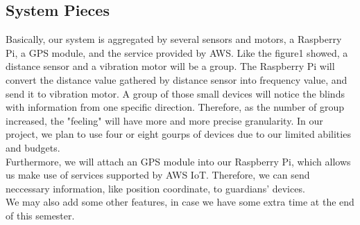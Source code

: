\documentclass{article}
\begin{document}
        \subsection{System Pieces}
        Basically, our system is aggregated by several sensors and motors, a Raspberry Pi, a GPS module, and the service provided by AWS. Like the figure1 showed, a distance sensor and a vibration motor will be a group. The Raspberry Pi will convert the distance value gathered by distance sensor into frequency value, and send it to vibration motor. A group of those small devices will notice the blinds with information from one specific direction. Therefore, as the number of group increased, the "feeling" will have more and more precise granularity. In our project, we plan to use four or eight gourps of devices due to our limited abilities and budgets.\\
        Furthermore, we will attach an GPS module into our Raspberry Pi, which allows us make use of services supported by AWS IoT. Therefore, we can send neccessary information, like position coordinate, to guardians' devices.\\
        We may also add some other features, in case we have some extra time at the end of this semester.
    
\end{document}
